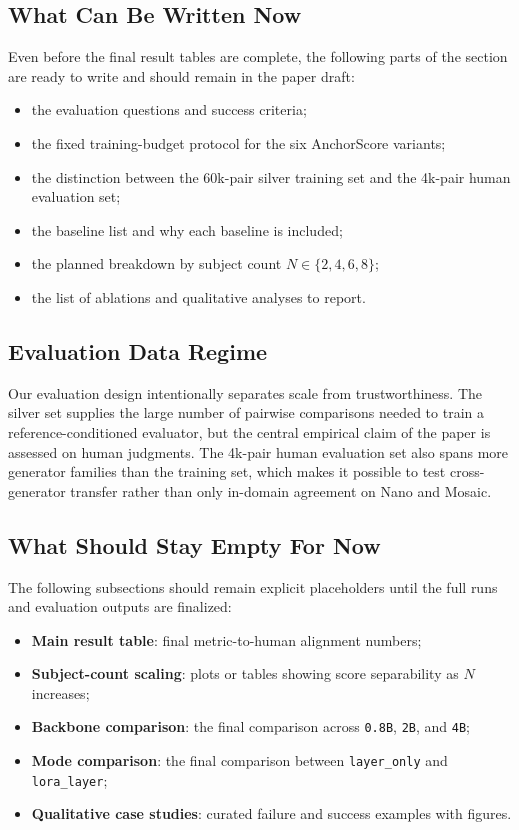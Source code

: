 \subsection{What Can Be Written Now}
Even before the final result tables are complete, the following parts of the section are ready to write and should remain in the paper draft:
\begin{itemize}
    \item the evaluation questions and success criteria;
    \item the fixed training-budget protocol for the six AnchorScore variants;
    \item the distinction between the 60k-pair silver training set and the 4k-pair human evaluation set;
    \item the baseline list and why each baseline is included;
    \item the planned breakdown by subject count $N \in \{2,4,6,8\}$;
    \item the list of ablations and qualitative analyses to report.
\end{itemize}

\subsection{Evaluation Data Regime}
Our evaluation design intentionally separates scale from trustworthiness. The silver set supplies the large number of pairwise comparisons needed to train a reference-conditioned evaluator, but the central empirical claim of the paper is assessed on human judgments. The 4k-pair human evaluation set also spans more generator families than the training set, which makes it possible to test cross-generator transfer rather than only in-domain agreement on Nano and Mosaic.

\subsection{What Should Stay Empty For Now}
The following subsections should remain explicit placeholders until the full runs and evaluation outputs are finalized:
\begin{itemize}
    \item \textbf{Main result table}: final metric-to-human alignment numbers;
    \item \textbf{Subject-count scaling}: plots or tables showing score separability as $N$ increases;
    \item \textbf{Backbone comparison}: the final comparison across \texttt{0.8B}, \texttt{2B}, and \texttt{4B};
    \item \textbf{Mode comparison}: the final comparison between \texttt{layer\_only} and \texttt{lora\_layer};
    \item \textbf{Qualitative case studies}: curated failure and success examples with figures.
\end{itemize}


